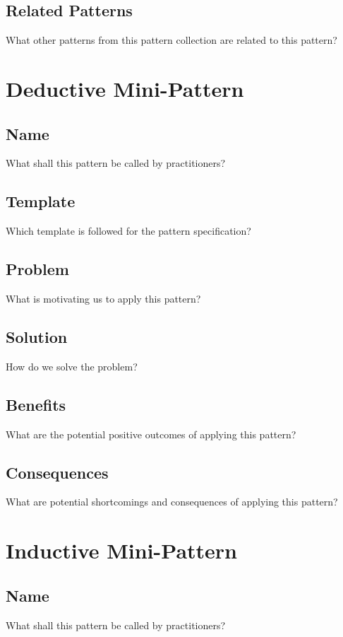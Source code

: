 \documentclass{article}
\begin{document}
\subsection{Related Patterns}
What other patterns from this pattern collection are related to this pattern?


\section{Deductive Mini-Pattern}

\subsection{Name}
What shall this pattern be called by practitioners?

\subsection{Template}
Which template is followed for the pattern specification?

\subsection{Problem}
What is motivating us to apply this pattern?

\subsection{Solution}
How do we solve the problem?

\subsection{Benefits}
What are the potential positive outcomes of applying this pattern?

\subsection{Consequences}
What are potential shortcomings and consequences of applying this pattern?


\section{Inductive Mini-Pattern}

\subsection{Name}
What shall this pattern be called by practitioners?
\end{document}
